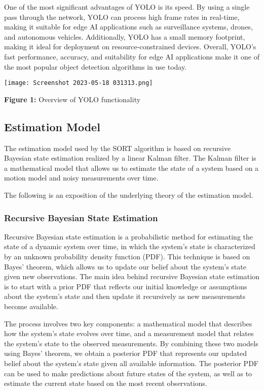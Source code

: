 \documentclass[11pt]{article}
\begin{document}
One of the most significant advantages of YOLO is its speed. By using a single pass through the network, YOLO can process high frame rates in real-time, making it suitable for edge AI applications such as surveillance systems, drones, and autonomous vehicles. Additionally, YOLO has a small memory footprint, making it ideal for deployment on resource-constrained devices. Overall, YOLO's fast performance, accuracy, and suitability for edge AI applications make it one of the most popular object detection algorithms in use today.

\begin{center}
\texttt{[image: Screenshot 2023-05-18 031313.png]}

\textbf{Figure 1:} Overview of YOLO functionality 
\end{center}
	\subsection{Estimation Model}
	The estimation model used by the SORT algorithm is based on recursive Bayesian state estimation realized by a linear Kalman filter. The Kalman filter is a mathematical model that allows us to estimate the state of a system based on a motion model and noisy measurements over time. 
	
	The following is an exposition of the underlying theory of the estimation model.
		\subsubsection{Recursive Bayesian State Estimation}
		Recursive Bayesian state estimation is a probabilistic method for estimating the state of a dynamic system over time, in which the system's state is characterized by an unknown probability density function (PDF). This technique is based on Bayes' theorem, which allows us to update our belief about the system's state given new observations. The main idea behind recursive Bayesian state estimation is to start with a prior PDF that reflects our initial knowledge or assumptions about the system's state and then update it recursively as new measurements become available.

The process involves two key components: a mathematical model that describes how the system's state evolves over time, and a measurement model that relates the system's state to the observed measurements. By combining these two models using Bayes' theorem, we obtain a posterior PDF that represents our updated belief about the system's state given all available information. The posterior PDF can be used to make predictions about future states of the system, as well as to estimate the current state based on the most recent observations.
\end{document}
